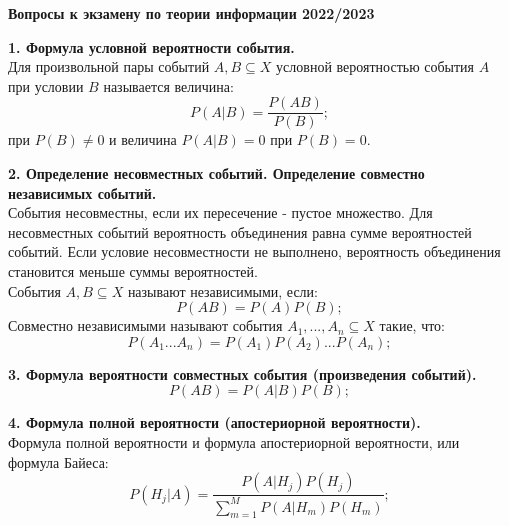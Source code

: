 \documentclass[14pt]{article}
\begin{document}
 

\renewcommand{\vec}[1]{\mbox{\mathversion{bold}$#1$}}
\pagestyle{plain}

\begin{center}
\textbf{
Вопросы к экзамену по теории информации 2022/2023
}
\end{center}

\bigskip
\textbf{1. Формула условной вероятности события.} \\

Для произвольной пары событий \( A, B \subseteq X\) условной вероятностью события \( A \) при условии \( B \) называется величина: \\
\begin{displaymath}
    P(A|B) = \frac{P(AB)}{P(B)};
\end{displaymath}
при \( P(B) \neq 0 \) и величина \( P(A|B) = 0 \) при \( P(B) = 0 \).

\bigskip
\textbf{2. Определение несовместных событий. Определение совместно независимых событий.} \\

События несовместны, если их пересечение - пустое множество. Для несовместных событий вероятность объединения равна сумме
вероятностей событий. Если условие несовместности не выполнено, вероятность объединения становится меньше суммы вероятностей. \\
События \( A, B \subseteq X\) называют независимыми, если: \\
\begin{displaymath}
    P(AB) = P(A)P(B);
\end{displaymath}
Совместно независимыми называют события \( A_1, ..., A_n \subseteq X \) такие, что:
\begin{displaymath}
    P(A_1 ... A_n) = P(A_1)P(A_2) ... P(A_n);
\end{displaymath}

\bigskip
\textbf{3. Формула вероятности совместных события (произведения событий).} \\

\begin{displaymath}
    P(AB) = P(A|B)P(B);
\end{displaymath}

\bigskip
\textbf{4. Формула полной вероятности (апостериорной вероятности).} \\

Формула полной вероятности и формула апостериорной вероятности, или формула Байеса:
\begin{displaymath}
    P(H_j|A) = \frac{P(A|H_j)P(H_j)}{\displaystyle\sum_{m=1}^{M} P(A|H_m)P(H_m)};
\end{displaymath}
\end{document}
